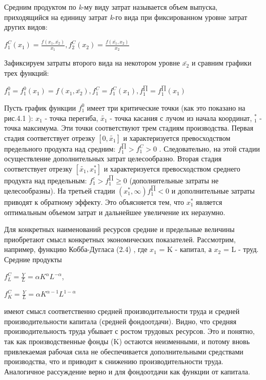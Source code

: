 \documentclass[12pt, 4paper]{book}
\begin{document}
{Средним продуктом по \textit{k}-му виду затрат называется объем выпуска, приходящийся на единицу затрат \textit{k}-го вида при фиксированном уровне затрат других видов: 
\begin{center}
$f_{1}^{C}(x_1)=\frac{f(x_1,\bar{x_2})}{x_1}, f_{2}^{C}(x_2)=\frac{f(\bar{x_1},x_2)}{x_2}$
\end{center}
\par

Зафиксируем затраты второго вида на некотором уровне $\bar{x_2}$ и сравним графики трех функций: 
\begin{center}
$f_{1}^{0}=f_{1}^{0}(x_1)=f(x_1,\bar{x_2}),f_{1}^{C}=f_{1}^{C}(x_1),f_{1}^{\prod }=f_{1}^{\prod}(x_1)$
\end{center}
\par

Пусть график функции $f_{1}^{0}$ имеет три критические точки (как это показано на рис.4.1 ): $\widehat{x_1}$ - точка перегиба, $\widetilde{x_1}$ - точка касания с лучом из начала координат, $_{1}^{*}$ - точка максимума. Эти точки соответствуют трем стадиям производства. Первая стадия соответствует отрезку $[0,\widetilde{x_1}]$ и характеризуется превосходством предельного продукта над средним: $f_{1}^{\prod}>f_{1}^{C}>0$ . Следовательно, на этой стадии осуществление дополнительных затрат целесообразно. Вторая стадия соответствует отрезку $[\widetilde{x_1},x_{1}^{*}]$ и характеризуется превосходством среднего продукта над предельным: $f_{1}^{c}>f_{1}^{\prod} \geq 0$ (дополнительные затраты не целесообразны). На третьей стадии $(x_{1}^{*},\infty)f_{1}^{\prod} < 0$ и дополнительные затраты приводят к обратному эффекту. Это объясняется тем, что $x_{1}^{*}$ является оптимальным объемом затрат и дальнейшее увеличение их неразумно. 
\par

Для конкретных наименований ресурсов средние и предельные величины приобретают смысл конкретных экономических показателей. Рассмотрим, например, функцию Кобба-Дугласа (2.4) , где $x_1$ = K - капитал, а $x_2$ = L - труд. Средние продукты 
\begin{center}
$f_{L}^{C}= \frac{Y}{L}=\alpha K^{\alpha} L^{- \alpha}$,
\end{center}
\begin{center}
$f_{K}^{C}=\frac{Y}{L}=\alpha K^{\alpha -1}L^{1-\alpha}$
\end{center}
имеют смысл соответственно средней производительности труда и средней производительности капитала (средней фондоотдачи). Видно, что средняя производительность труда убывает с ростом трудовых ресурсов. Это и понятно, так как производственные фонды (K) остаются неизменными, и потому вновь привлекаемая рабочая сила не обеспечивается дополнительными средствами производства, что и приводит к снижению производительности труда. Аналогичное рассуждение верно и для фондоотдачи как функции от капитала. 
\par

}
\end{document}
